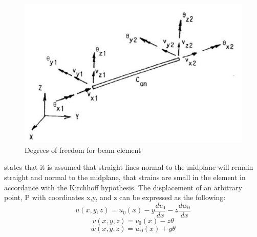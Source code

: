 \begin{figure}[H]
\centering
\includegraphics[scale=0.5]{figures/beamri}
\caption[$\; \:$Beam Element]{Degrees of freedom for beam element\cite{sintef2017} }
 \label{fig:beamri}
\end{figure}

\noindent \cite{sintef2017} states that it is assumed that straight lines normal to the midplane will remain straight and normal to the midplane, that strains are small in the element in accordance with the Kirchhoff hypothesis.\newline
\newline The displacement of an arbitrary point, P with coordinates x,y, and z can be expressed as the following:
\begin{equation}
    u(x,y,z)=u_0(x) - y \frac{dv_0}{dx} - z \frac{dw_0}{dx}
\end{equation}
\begin{equation}
    v(x,y,z)=v_0(x) - z \theta
\end{equation}
\begin{equation}
    w(x,y,z)=w_0(x) + y \theta
\end{equation}


